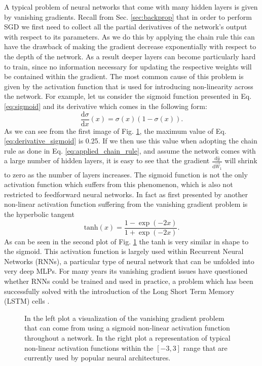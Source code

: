 A typical problem of neural networks that come with many hidden layers is given by vanishing gradients. Recall from Sec. \ref{sec:backprop} that in order to perform SGD we first need to collect all the partial derivatives of the network's output with respect to its parameters. As we do this by applying the chain rule this can have the drawback of making the gradient decrease exponentially with respect to the depth of the network. As a result deeper layers can become particularly hard to train, since no information necessary for updating the respective weights will be contained within the gradient. The most common cause of this problem is given by the activation function that is used for introducing non-linearity across the network. For example, let us consider the sigmoid function presented in Eq. \ref{eq:sigmoid} and its derivative which comes in the following form:
\begin{equation}
	\frac{\text{d}\sigma}{\text{d}x}(x) = \sigma(x)(1-\sigma(x)).
	\label{eq:derivative_sigmoid}
\end{equation}
As we can see from the first image of Fig. \ref{fig:activation_functions}, the maximum value of Eq. \ref{eq:derivative_sigmoid} is 0.25. If we then use this value when adopting the chain rule as done in Eq. \ref{eq:applied_chain_rule}, and assume the network comes with a large number of hidden layers, it is easy to see that the gradient $\frac{\text{d}\hat{y}}{\text{d}\vec{W}_1}$ will shrink to zero as the number of layers increases. The sigmoid function is not the only activation function which suffers from this phenomenon, which is also not restricted to feedforward neural networks. In fact as first presented by \citet{} another non-linear activation function suffering from the vanishing gradient problem is the hyperbolic tangent 
\begin{equation}
	\text{tanh}(x) = \frac{1-\exp(-2x)}{1+\exp(-2x)}.
\end{equation}
As can be seen in the second plot of Fig. \ref{fig:activation_functions} the tanh is very similar in shape to the sigmoid. This activation function is largely used within Recurrent Neural Networks (RNNs), a particular type of neural network that can be unfolded into very deep MLPs. For many years its vanishing gradient issues have questioned whether RNNs could be trained and used in practice, a problem which has been successfully solved with the introduction of the Long Short Term Memory (LSTM) cells \cite{hochreiter1997long}. 

\begin{figure}[ht!]
	\centering
	
	\caption{In the left plot a visualization of the vanishing gradient problem that can come from using a sigmoid non-linear activation function throughout a network. In the right plot a representation of typical non-linear activation functions within the $[-3,3]$ range that are currently used by popular neural architectures.}
\label{fig:activation_functions}
\end{figure}

